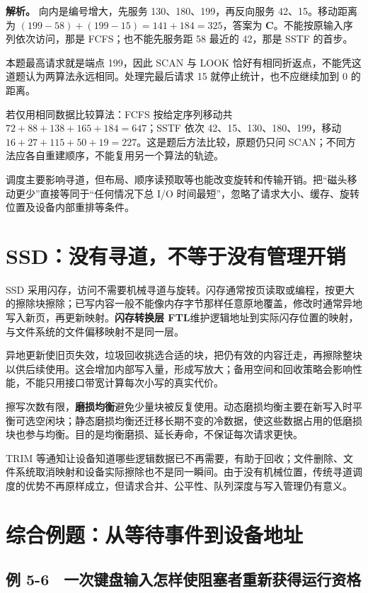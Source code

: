 \textbf{解析。} 向内是编号增大，先服务 130、180、199，再反向服务 42、15。移动距离为 \((199-58)+(199-15)=141+184=325\)，答案为 \textbf{C}。不能按原输入序列依次访问，那是 FCFS；也不能先服务距 58 最近的 42，那是 SSTF 的首步。

本题最高请求就是端点 199，因此 SCAN 与 LOOK 恰好有相同折返点，不能凭这道题认为两算法永远相同。处理完最后请求 15 就停止统计，也不应继续加到 0 的距离。

若仅用相同数据比较算法：FCFS 按给定序列移动共 \(72+88+138+165+184=647\)；SSTF 依次 42、15、130、180、199，移动 \(16+27+115+50+19=227\)。这是题后方法比较，原题仍只问 SCAN；不同方法应各自重建顺序，不能复用另一个算法的轨迹。

调度主要影响寻道，但布局、顺序读预取等也能改变旋转和传输开销。把``磁头移动更少''直接等同于``任何情况下总 I/O 时间最短''，忽略了请求大小、缓存、旋转位置及设备内部重排等条件。

\section{SSD：没有寻道，不等于没有管理开销}\label{OS05-7-10}

SSD 采用闪存，访问不需要机械寻道与旋转。闪存通常按页读取或编程，按更大的擦除块擦除；已写内容一般不能像内存字节那样任意原地覆盖，修改时通常异地写入新页，再更新映射。\textbf{闪存转换层 FTL}维护逻辑地址到实际闪存位置的映射，与文件系统的文件偏移映射不是同一层。

异地更新使旧页失效，垃圾回收挑选合适的块，把仍有效的内容迁走，再擦除整块以供后续使用。这会增加内部写入量，形成写放大；备用空间和回收策略会影响性能，不能只用接口带宽计算每次小写的真实代价。

擦写次数有限，\textbf{磨损均衡}避免少量块被反复使用。动态磨损均衡主要在新写入时平衡可选空闲块；静态磨损均衡还迁移长期不变的冷数据，使这些数据占用的低磨损块也参与均衡。目的是均衡磨损、延长寿命，不保证每次请求更快。

TRIM 等通知让设备知道哪些逻辑数据已不再需要，有助于回收；文件删除、文件系统取消映射和设备实际擦除也不是同一瞬间。由于没有机械位置，传统寻道调度的优势不再原样成立，但请求合并、公平性、队列深度与写入管理仍有意义。

\section{综合例题：从等待事件到设备地址}\label{OS05-7-11}

\subsection{例 5-6　一次键盘输入怎样使阻塞者重新获得运行资格}\label{OS05-ex7-6}

